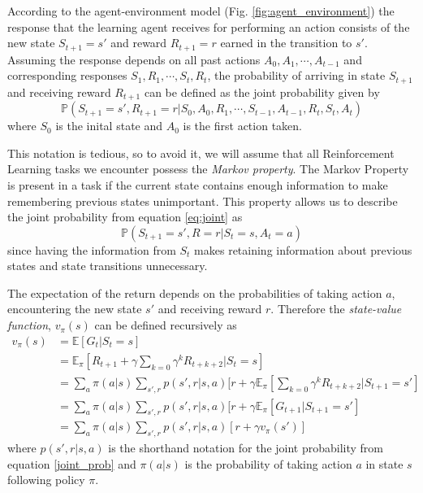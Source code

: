 \documentclass[11pt]{article}
\begin{document}
According to the agent-environment model (Fig. \ref{fig:agent_environment}) the response that
the learning agent receives for performing an action consists
of the new state $S_{t+1} = s'$ and reward $R_{t+1} = r$ earned in the transition
to $s'$.
Assuming the response depends on all past actions $A_{0}, A_{1}, \cdots, A_{t-1}$ and
corresponding responses $S_{1}, R_{1}, \cdots, S_{t}, R_{t}$, the probability
of arriving in state $S_{t+1}$ and receiving reward $R_{t+1}$ can be defined as the
joint probability given by
\begin{equation}\label{eq:joint}
    \mathds{P}(S_{t+1} = s', R_{t+1} = r | S_0, A_0, R_1, \cdots, S_{t-1}, A_{t-1}, R_{t}, S_{t}, A_{t})
\end{equation}
where $S_0$ is the inital state and $A_0$ is the first action taken.

This notation is tedious, so to avoid it, we will assume that all Reinforcement Learning tasks
we encounter possess the \textit{Markov property}.
The Markov Property is present in a task if the current state contains
enough information to make remembering previous states unimportant.
This property allows us to describe the joint probability from equation \ref{eq:joint}
as
\begin{equation}\label{joint_prob}
    \mathds{P}(S_{t+1} = s', R = r | S_t = s, A_t = a)
\end{equation}
since having the information from $S_t$ makes retaining information about previous states
and state transitions unnecessary.

The expectation of the return depends on the probabilities of taking action $a$,
encountering the new state $s'$ and receiving reward $r$.
Therefore the \textit{state-value function}, $v_\pi(s)$ can be defined recursively as
\begin{equation}
    \begin{aligned}
        v_\pi(s) &= \mathds{E}[ G_t | S_t = s]\\
        & = \mathds{E}_\pi[R_{t+1} + \gamma \sum\limits_{k=0} \gamma^k R_{t+k+2} | S_t = s]\\
        & = \sum\limits_{a} \pi(a|s) \sum\limits_{s', r} p(s', r | s, a) [r + \gamma \mathds{E}_\pi[\sum\limits_{k=0} \gamma^k R_{t+k+2} | S_{t+1} = s']\\
        & =  \sum\limits_{a} \pi(a|s) \sum\limits_{s', r} p(s', r | s, a) [r + \gamma \mathds{E}_\pi[G_{t+1} | S_{t+1} = s']\\
        & =   \sum\limits_{a} \pi(a|s) \sum\limits_{s', r} p(s', r | s, a) [r + \gamma v_\pi(s')]
    \end{aligned}
\end{equation}
where $p(s', r | s, a)$ is the shorthand notation for the joint probability from equation \ref{joint_prob} and $\pi(a|s)$ is the
probability of taking action $a$ in state $s$ following policy $\pi$.

%
%
\end{document}
